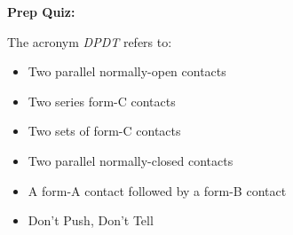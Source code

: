 \vfil \eject

\noindent
{\bf Prep Quiz:}

The acronym {\it DPDT} refers to:

\begin{itemize}
\item{} Two parallel normally-open contacts
\vskip 5pt 
\item{} Two series form-C contacts
\vskip 5pt 
\item{} Two sets of form-C contacts
\vskip 5pt 
\item{} Two parallel normally-closed contacts 
\vskip 5pt 
\item{} A form-A contact followed by a form-B contact
\vskip 5pt 
\item{} Don't Push, Don't Tell 
\end{itemize}



